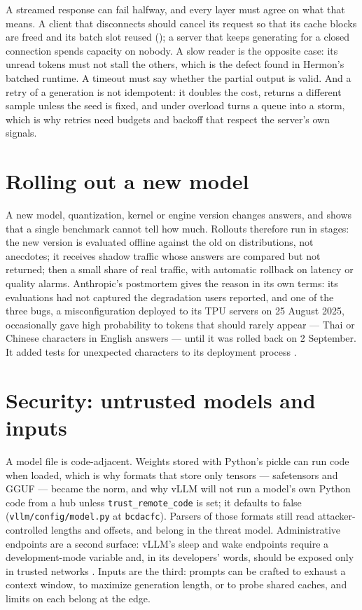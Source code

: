 A streamed response can fail halfway, and every layer must agree on what that
means. A client that disconnects should cancel its request so that its cache
blocks are freed and its batch slot reused (); a
server that keeps generating for a closed connection spends capacity on nobody.
A slow reader is the opposite case: its unread tokens must not stall the others,
which is the defect  found in Hermon's batched runtime. A
timeout must say whether the partial output is valid. And a retry of a
generation is not idempotent: it doubles the cost, returns a different sample
unless the seed is fixed, and under overload turns a queue into a storm, which
is why retries need budgets and backoff that respect the server's own signals.

\section{Rolling out a new model}

A new model, quantization, kernel or engine version changes answers, and
 shows that a single benchmark cannot tell how much.
Rollouts therefore run in stages: the new version is evaluated offline against
the old on distributions, not anecdotes; it receives shadow traffic whose
answers are compared but not returned; then a small share of real traffic, with
automatic rollback on latency or quality alarms. Anthropic's postmortem gives
the reason in its own terms: its evaluations had not captured the degradation
users reported, and one of the three bugs, a misconfiguration deployed to its TPU
servers on 25 August 2025, occasionally gave high probability to tokens that
should rarely appear --- Thai or Chinese characters in English answers --- until it
was rolled back on 2 September. It added tests for unexpected characters to its
deployment process \cite{anthropic2025postmortem}.

\section{Security: untrusted models and inputs}

A model file is code-adjacent. Weights stored with Python's pickle can run code
when loaded, which is why formats that store only tensors --- safetensors and
GGUF --- became the norm, and why vLLM will not run a model's own Python code from
a hub unless \texttt{trust\_remote\_code} is set; it defaults to false
(\texttt{vllm/config/model.py} at \texttt{bcdacfc}). Parsers of those formats
still read attacker-controlled lengths and offsets, and belong in the threat
model. Administrative endpoints are a second surface: vLLM's sleep and wake
endpoints require a development-mode variable and, in its developers' words,
should be exposed only in trusted networks \cite{vllm2025sleepmode}. Inputs are
the third: prompts can be crafted to exhaust a context window, to maximize
generation length, or to probe shared caches, and limits on each belong at the
edge.

